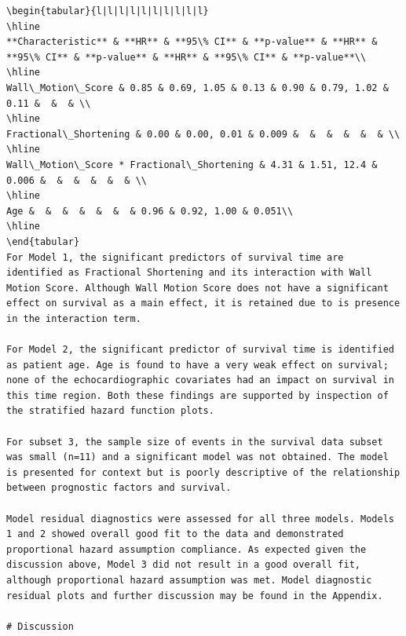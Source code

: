 \documentclass[
]{article}
\begin{document}
\begin{verbatim}
\begin{tabular}{l|l|l|l|l|l|l|l|l|l}
\hline
**Characteristic** & **HR** & **95\% CI** & **p-value** & **HR** & **95\% CI** & **p-value** & **HR** & **95\% CI** & **p-value**\\
\hline
Wall\_Motion\_Score & 0.85 & 0.69, 1.05 & 0.13 & 0.90 & 0.79, 1.02 & 0.11 &  &  & \\
\hline
Fractional\_Shortening & 0.00 & 0.00, 0.01 & 0.009 &  &  &  &  &  & \\
\hline
Wall\_Motion\_Score * Fractional\_Shortening & 4.31 & 1.51, 12.4 & 0.006 &  &  &  &  &  & \\
\hline
Age &  &  &  &  &  &  & 0.96 & 0.92, 1.00 & 0.051\\
\hline
\end{tabular}
For Model 1, the significant predictors of survival time are identified as Fractional Shortening and its interaction with Wall Motion Score. Although Wall Motion Score does not have a significant effect on survival as a main effect, it is retained due to is presence in the interaction term.  

For Model 2, the significant predictor of survival time is identified as patient age. Age is found to have a very weak effect on survival; none of the echocardiographic covariates had an impact on survival in this time region. Both these findings are supported by inspection of the stratified hazard function plots.  

For subset 3, the sample size of events in the survival data subset was small (n=11) and a significant model was not obtained. The model is presented for context but is poorly descriptive of the relationship between prognostic factors and survival.

Model residual diagnostics were assessed for all three models. Models 1 and 2 showed overall good fit to the data and demonstrated proportional hazard assumption compliance. As expected given the discussion above, Model 3 did not result in a good overall fit, although proportional hazard assumption was met. Model diagnostic residual plots and further discussion may be found in the Appendix. 

# Discussion


\end{verbatim}
\end{document}
